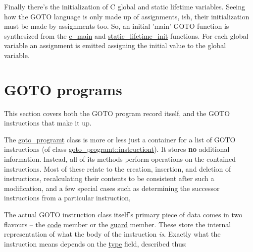 \documentclass{article}
\begin{document}
Finally there's the initialization of C global and static lifetime variables.
Seeing how the GOTO language is only made up of assignments, ish, their
initialization must be made by assignments too. So, an initial 'main' GOTO
function is synthesized from the \url{c_main} and
\url{static_lifetime_init} functions. For each global variable an
assignment is emitted assigning the initial value to the global variable.

\section{GOTO programs}

This section covers both the GOTO program record itself, and the GOTO
instructions that make it up.

The \url{goto_programt} class is more or less just a container for a
list of GOTO instructions (of class \url{goto_programt::instructiont}).
It stores \textbf{no} additional information. Instead, all of its methods
perform operations on the contained instructions. Most of these relate
to the creation, insertion, and deletion of instructions, recalculating
their contents to be consistent after such a modification, and a few
special cases such as determining the successor instructions from a
particular instruction,

The actual GOTO instruction class itself's primary piece of data comes in
two flavours -- the \url{code} member or the \url{guard} member.
These store the internal representation of what the body of the instruction
\textit{is}. Exactly what the instruction means depends on the \url{type}
field, described thus:
\end{document}
